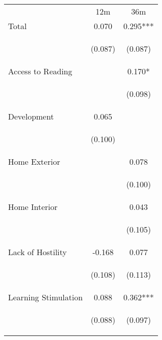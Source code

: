 \begin{tabular}{lcc}
\hline \noalign{\smallskip} & 12m & 36m\\
\noalign{\smallskip}\hline \noalign{\smallskip}Total & 0.070 & 0.295***\\
 & \begin{footnotesize}(0.087)\end{footnotesize} & \begin{footnotesize}(0.087)\end{footnotesize}\\
\noalign{\smallskip}Access to Reading &  & 0.170*\\
 & \begin{footnotesize}\end{footnotesize} & \begin{footnotesize}(0.098)\end{footnotesize}\\
\noalign{\smallskip}Development & 0.065 & \\
 & \begin{footnotesize}(0.100)\end{footnotesize} & \begin{footnotesize}\end{footnotesize}\\
\noalign{\smallskip}Home Exterior &  & 0.078\\
 & \begin{footnotesize}\end{footnotesize} & \begin{footnotesize}(0.100)\end{footnotesize}\\
\noalign{\smallskip}Home Interior &  & 0.043\\
 & \begin{footnotesize}\end{footnotesize} & \begin{footnotesize}(0.105)\end{footnotesize}\\
\noalign{\smallskip}Lack of Hostility & -0.168 & 0.077\\
 & \begin{footnotesize}(0.108)\end{footnotesize} & \begin{footnotesize}(0.113)\end{footnotesize}\\
\noalign{\smallskip}Learning Stimulation & 0.088 & 0.362***\\
 & \begin{footnotesize}(0.088)\end{footnotesize} & \begin{footnotesize}(0.097)\end{footnotesize}\\

\end{tabular}
